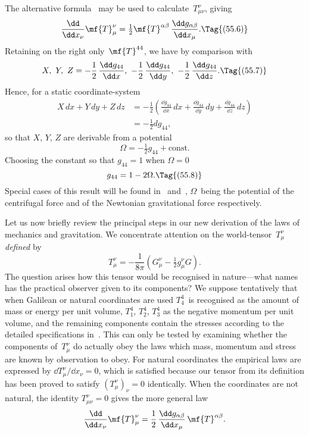 \documentclass[12pt]{book}
\begin{document}
The alternative formula~ may be used to calculate~$T_{\mu\nu}^{\nu}$, giving
\[
\frac{\dd}{\dd x_{\nu}} \mf{T}_{\mu}^{\nu}
= \tfrac{1}{2} \mf{T}^{\alpha\beta}\, \frac{\dd g_{\alpha\beta}}{\dd x_{\mu}}.
\Tag{(55.6)}
\]
Retaining on the right only~$\mf{T}^{44}$, we have by comparison with~
\[
X,\ Y,\ Z = -\frac{1}{2}\, \frac{\dd g_{44}}{\dd x},\
-\frac{1}{2}\, \frac{\dd g_{44}}{\dd y},\
-\frac{1}{2}\, \frac{\dd g_{44}}{\dd z}.
\Tag{(55.7)}
\]
Hence, for a static coordinate-system
\begin{align*}
  X\, dx + Y\, dy + Z\, dz
  &= -\frac{1}{2}\left(\frac{\dd g_{44}}{\dd x}\, dx + \frac{\dd g_{44}}{\dd y}\, dy + \frac{\dd g_{44}}{\dd z}\, dz\right) \\
  &= -\tfrac{1}{2} dg_{44},
\end{align*}
so that $X$, $Y$, $Z$ are derivable from a potential
%
\[
\Omega = -\tfrac{1}{2} g_{44} + \text{const.}
\]
Choosing the constant so that $g_{44} = 1$ when $\Omega = 0$
\[
g_{44} = 1 - 2\Omega.
\Tag{(55.8)}
\]
Special cases of this result will be found in~ and~, $\Omega$~being the
potential of the centrifugal force and of the Newtonian gravitational force
respectively.

Let us now briefly review the principal steps in our new derivation of the
laws of mechanics and gravitation. We concentrate attention on the world-tensor~$T_{\mu}^{\nu}$
\emph{defined} by
\[
T_{\mu}^{\nu} = -\frac{1}{8\pi} (G_{\mu}^{\nu} - \tfrac{1}{2} g_{\mu}^{\nu} G).
\]
The question arises how this tensor would be recognised in nature---what
names has the practical observer given to its components? We suppose
tentatively that when Galilean or natural coordinates are used $T_{4}^{4}$~is recognised
as the amount of mass or energy per unit volume, $T_{1}^{4}$, $T_{2}^{4}$, $T_{3}^{4}$ as the negative
momentum per unit volume, and the remaining components contain the
stresses according to the detailed specifications in~\Eq{(53.91)}. This can only be
tested by examining whether the components of~$T_{\mu}^{\nu}$ do actually obey the laws
which mass, momentum and stress are known by observation to obey. For
natural coordinates the empirical laws are expressed by $\dd T_{\mu}^{\nu}/\dd x_{\nu} = 0$, which is
satisfied because our tensor from its definition has been proved to satisfy
$(T_{\mu}^{\nu})_{\nu} = 0$ identically. When the coordinates are not natural, the identity
$T_{\mu\nu}^{\nu} = 0$ gives the more general law
\[
\frac{\dd}{\dd x_{\nu}} \mf{T}_{\mu}^{\nu}
= \frac{1}{2}\, \frac{\dd g_{\alpha\beta}}{\dd x_{\mu}}\, \mf{T}^{\alpha\beta}.
\]
\end{document}
